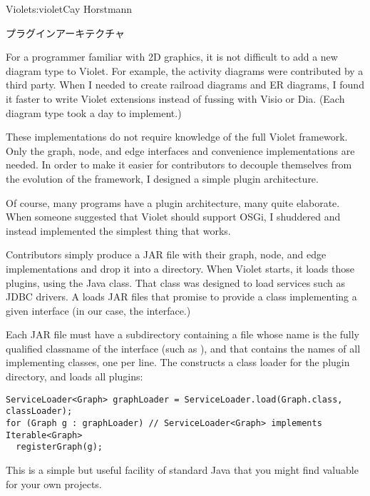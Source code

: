 \begin{aosachapter}{Violet}{s:violet}{Cay Horstmann}
\begin{aosasect1}{プラグインアーキテクチャ}

For a programmer familiar with 2D graphics, it is not difficult to add
a new diagram type to Violet. For example, the activity diagrams were
contributed by a third party. When I needed to create railroad
diagrams and ER diagrams, I found it faster to write Violet extensions
instead of fussing with Visio or Dia. (Each diagram type took a day to
implement.)

These implementations do not require knowledge of the full Violet
framework.  Only the graph, node, and edge interfaces and convenience
implementations are needed. In order to make it easier for
contributors to decouple themselves from the evolution of the
framework, I designed a simple plugin architecture.

Of course, many programs have a plugin architecture, many quite
elaborate.  When someone suggested that Violet should support OSGi, I
shuddered and instead implemented the simplest thing that works.

Contributors simply produce a JAR file with their graph, node, and
edge implementations and drop it into a  directory. When
Violet starts, it loads those plugins, using the Java
 class. That class was designed to load services
such as JDBC drivers. A  loads JAR files that
promise to provide a class implementing a given interface (in our
case, the  interface.)

Each JAR file must have a subdirectory 
containing a file whose name is the fully qualified classname of the
interface (such as ), and that
contains the names of all implementing classes, one per line.
The  constructs a class loader for the plugin
directory, and loads all plugins:

\begin{verbatim}
ServiceLoader<Graph> graphLoader = ServiceLoader.load(Graph.class, classLoader);
for (Graph g : graphLoader) // ServiceLoader<Graph> implements Iterable<Graph>
  registerGraph(g); 
\end{verbatim}

This is a simple but useful facility of standard Java that you might
find valuable for your own projects.

\end{aosasect1}


\end{aosachapter}
